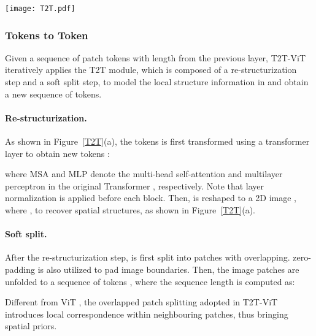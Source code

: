 \documentclass[10pt,twocolumn,letterpaper]{article}
\begin{document}
\begin{figure*}[!t]
  \graphicspath{{Figures/Network/}}
  \centering
  \texttt{[image: T2T.pdf]}
  \caption{(a) T2T module merges neighbouring tokens into a new token, thus reducing the length of tokens. (b) Our proposed reverse T2T module upsamples tokens by expanding each token into multiple sub-tokens.}
  \label{T2T}
  \vspace{-0.3cm}
\end{figure*}


\vspace{-3mm}
\subsubsection{Tokens to Token}
Given a sequence of patch tokens  with length  from the previous layer, T2T-ViT iteratively applies the T2T module, which is composed of a re-structurization step and a soft split step, to model the local structure information in  and obtain a new sequence of tokens.

\vspace{-3mm}
\paragraph{Re-structurization.}
As shown in Figure~\ref{T2T}(a), the tokens  is first transformed using a transformer layer to obtain new tokens :

where MSA and MLP denote the multi-head self-attention and multilayer perceptron in the original Transformer \cite{vaswani2017attention}, respectively. Note that layer normalization \cite{ba2016layer} is applied before each block.
Then,  is reshaped to a 2D image , where , to recover spatial structures, as shown in Figure~\ref{T2T}(a).

\vspace{-3mm}
\paragraph{Soft split.}
After the re-structurization step,  is first split into  patches with  overlapping.  zero-padding is also utilized to pad image boundaries. Then, the image patches are unfolded to a sequence of tokens , where the sequence length  is computed as:

Different from ViT \cite{dosovitskiy2020image}, the overlapped patch splitting adopted in T2T-ViT introduces local correspondence within neighbouring patches, thus bringing spatial priors.
\end{document}
